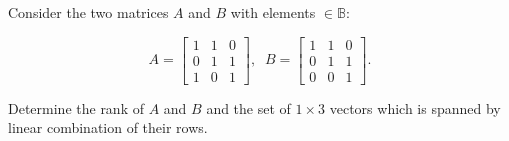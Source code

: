 \begin{vworkexamplestatement}
\label{ex:cedc0:sfft0:rmc0:01}
Consider the two matrices $A$ and $B$ with elements $\in \mathbb{B}$:

\begin{equation}
\label{eq:cedc0:sfft0:rmc0:01}
A = \left[\begin{array}{ccc}1&1&0\\0&1&1\\1&0&1\end{array}\right], \;\;
B = \left[\begin{array}{ccc}1&1&0\\0&1&1\\0&0&1\end{array}\right].
\end{equation}

Determine the rank of $A$ and $B$ and the set of $1 \times 3$ vectors
which is spanned by linear combination of their rows.
\end{vworkexamplestatement}
